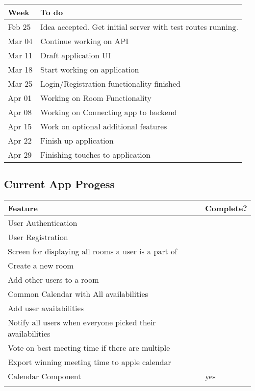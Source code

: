 \documentclass[11pt]{article}
\begin{document}
\begin{center}
\begin{tabular}{ll}
Week & To do\\
\hline
Feb 25 & Idea accepted. Get initial server with test routes running.\\
Mar 04 & Continue working on API\\
Mar 11 & Draft application UI\\
Mar 18 & Start working on application\\
Mar 25 & Login/Registration functionality finished\\
Apr 01 & Working on Room Functionality\\
Apr 08 & Working on Connecting app to backend\\
Apr 15 & Work on optional additional features\\
Apr 22 & Finish up application\\
Apr 29 & Finishing touches to application\\
\end{tabular}
\end{center}

\subsection{Current App Progess}
\label{sec:org7c324f9}

\begin{center}
\begin{tabular}{ll}
Feature & Complete?\\
\hline
User Authentication & \\
User Registration & \\
Screen for displaying all rooms a user is a part of & \\
Create a new room & \\
Add other users to a room & \\
Common Calendar with All availabilities & \\
Add user availabilities & \\
Notify all users when everyone picked their availabilities & \\
Vote on best meeting time if there are multiple & \\
Export winning meeting time to apple calendar & \\
Calendar Component & yes\\
 & \\
\end{tabular}
\end{center}
\end{document}
